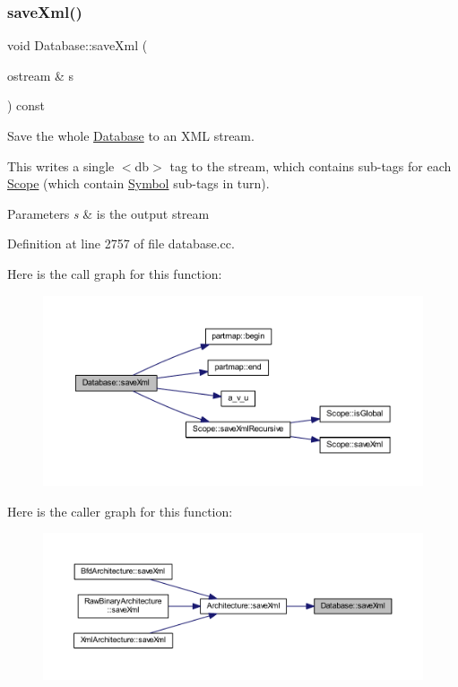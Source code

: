 \subsubsection{\texorpdfstring{saveXml()}{saveXml()}}
{\footnotesize\ttfamily void Database\+::save\+Xml (\begin{DoxyParamCaption}\item[{ostream \&}]{s }\end{DoxyParamCaption}) const}



Save the whole \mbox{\hyperlink{class_database}{Database}} to an X\+ML stream. 

This writes a single $<$db$>$ tag to the stream, which contains sub-\/tags for each \mbox{\hyperlink{class_scope}{Scope}} (which contain \mbox{\hyperlink{class_symbol}{Symbol}} sub-\/tags in turn). 
\begin{DoxyParams}{Parameters}
{\em s} & is the output stream \\
\hline
\end{DoxyParams}


Definition at line 2757 of file database.\+cc.

Here is the call graph for this function\+:
\nopagebreak
\begin{figure}[H]
\begin{center}
\leavevmode
\includegraphics[width=350pt]{class_database_ae44b2d77910ea8fd574443e5d7da55e9_cgraph}
\end{center}
\end{figure}
Here is the caller graph for this function\+:
\nopagebreak
\begin{figure}[H]
\begin{center}
\leavevmode
\includegraphics[width=350pt]{class_database_ae44b2d77910ea8fd574443e5d7da55e9_icgraph}
\end{center}
\end{figure}
\mbox{\label{class_database_a24a13d8036c39ae06909cb698529695f}} 
